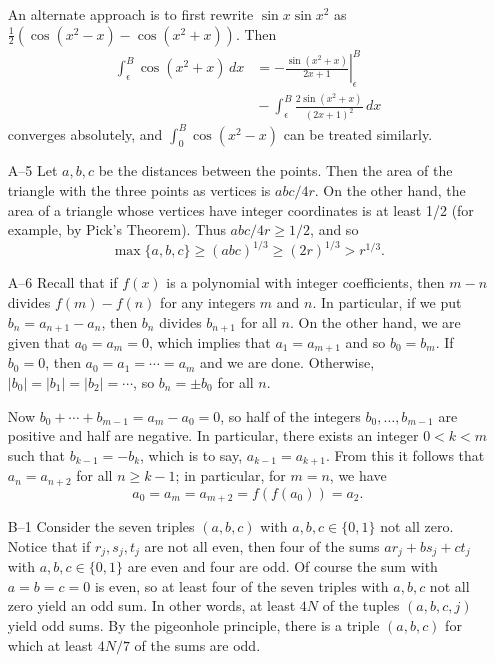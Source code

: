 \documentclass[amssymb,twocolumn,pra,10pt,aps]{revtex4-1}
\begin{document}
\begin{itemize}
An alternate approach is to first rewrite $\sin x \sin x^2$ as
$\frac{1}{2}(\cos (x^2-x) - \cos (x^2+x))$. Then
\begin{align*}
\int_\epsilon^B \cos(x^2+x)\,dx &=
- \left. \frac{\sin (x^2+x)}{2x+1} \right|_\epsilon^B \\
&\mbox{} - \int_\epsilon^B \frac{2\sin(x^2+x)}{(2x+1)^2}\,dx
\end{align*}
converges absolutely, and $\int_0^B \cos (x^2-x)$ can be
treated similarly.


\item[A--5]
Let $a,b,c$ be the distances between the points. Then the area of the triangle
with the three points as vertices
is $abc/4r$. On the other hand, the area of a triangle whose vertices
have integer coordinates is at least 1/2 (for example,
by Pick's Theorem). Thus $abc/4r \geq 1/2$,
and so
\[
\max\{a,b,c\} \geq (abc)^{1/3} \geq (2r)^{1/3} > r^{1/3}.
\]


\item[A--6]
Recall that if $f(x)$ is a polynomial with integer coefficients,
then $m-n$ divides $f(m)-f(n)$ for any integers $m$ and $n$. In particular,
if we put $b_n = a_{n+1} - a_n$, then $b_n$ divides $b_{n+1}$ for all $n$.
On the other hand, we are given that $a_0=a_m=0$, which implies that
$a_1=a_{m+1}$ and so $b_0=b_m$. If $b_0=0$, then $a_0=a_1=\cdots=a_m$
and we are done. Otherwise, $|b_0| = |b_1| = |b_2| = \cdots$, so
$b_n = \pm b_0$ for all $n$.

Now $b_0 + \cdots + b_{m-1} = a_m - a_0 = 0$, so half of the integers $b_0,
\dots, b_{m-1}$ are positive and half are negative. In particular, there
exists an integer $0<k<m$ such that $b_{k-1} = -b_k$, which is to say,
$a_{k-1} = a_{k+1}$. From this it follows that $a_n = a_{n+2}$ for all
$n \geq k-1$; in particular, for $m=n$, we have
\[
a_0 = a_m = a_{m+2} = f(f(a_0))
= a_2.
\]


\item[B--1]
Consider the seven triples $(a,b,c)$ with $a,b,c \in \{0,1\}$ not
all zero. Notice that if $r_j, s_j, t_j$ are not all even, then four
of the sums $ar_j + bs_j + ct_j$ with $a,b,c \in \{0,1\}$ are even
and four are odd. Of course the sum with $a=b=c=0$ is even, so at
least four of the seven triples with $a,b,c$ not all zero yield an odd
sum. In other words, at least $4N$ of the tuples $(a,b,c,j)$ yield
odd sums. By the pigeonhole principle, there is a triple $(a,b,c)$
for which at least $4N/7$ of the sums are odd.




\end{itemize}
\end{document}
